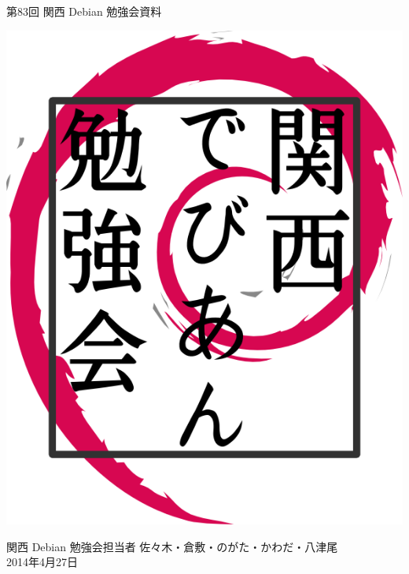 \documentclass[mingoth,a4paper]{jsarticle}
\newcommand{\debmtgyear}{2014}
\newcommand{\debmtgdate}{27}
\newcommand{\debmtgmonth}{4}
\newcommand{\debmtgnumber}{83}
\begin{document}
\begin{titlepage}


 第\debmtgnumber{}回 関西 Debian 勉強会資料

\vspace{2cm}

\begin{center}
\includegraphics{image200802/kansaidebianlogo.png}
\end{center}

\begin{flushright}
\hfill{}関西 Debian 勉強会担当者 佐々木・倉敷・のがた・かわだ・八津尾 \\
\hfill{}\debmtgyear{}年\debmtgmonth{}月\debmtgdate{}日
\end{flushright}

\thispagestyle{empty}
\end{titlepage}


\vspace{1em}
\end{document}
